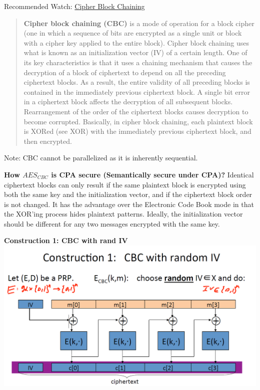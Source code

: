 \documentclass[11pt]{article}
\makeatletter
\def\maxwidth{\ifdim\Gin@nat@width>\linewidth\linewidth
    \else\Gin@nat@width\fi}
\let\Oldincludegraphics\includegraphics
\renewcommand{\includegraphics}[1]{\Oldincludegraphics[width=.8\maxwidth]{#1}}
\makeatother
\begin{document}
Recommended Watch:
\href{https://www.coursera.org/learn/crypto/lecture/wlIX8/modes-of-operation-many-time-key-cbc}{Cipher
Block Chaining}

\begin{quote}
\textbf{Cipher block chaining (CBC)} is a mode of operation for a block
cipher (one in which a sequence of bits are encrypted as a single unit
or block with a cipher key applied to the entire block). Cipher block
chaining uses what is known as an initialization vector (IV) of a
certain length. One of its key characteristics is that it uses a
chaining mechanism that causes the decryption of a block of ciphertext
to depend on all the preceding ciphertext blocks. As a result, the
entire validity of all preceding blocks is contained in the immediately
previous ciphertext block. A single bit error in a ciphertext block
affects the decryption of all subsequent blocks. Rearrangement of the
order of the ciphertext blocks causes decryption to become corrupted.
Basically, in cipher block chaining, each plaintext block is XORed (see
XOR) with the immediately previous ciphertext block, and then encrypted.
\end{quote}

Note: CBC cannot be parallelized as it is inherently sequential.

\textbf{How \(AES_{CBC}\) is CPA secure (Semantically secure under
CPA)?} Identical ciphertext blocks can only result if the same plaintext
block is encrypted using both the same key and the initialization
vector, and if the ciphertext block order is not changed. It has the
advantage over the Electronic Code Book mode in that the XOR'ing process
hides plaintext patterns. Ideally, the initialization vector should be
different for any two messages encrypted with the same key.

\textbf{Construction 1: CBC with rand IV}
\includegraphics{./Images/CBC-1.png}
\end{document}
